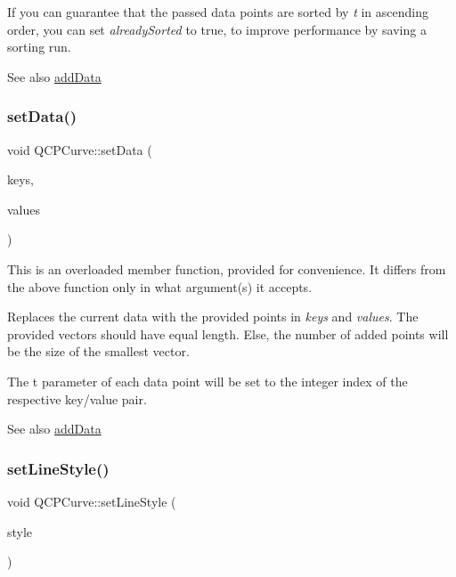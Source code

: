If you can guarantee that the passed data points are sorted by {\itshape t} in ascending order, you can set {\itshape already\+Sorted} to true, to improve performance by saving a sorting run.

\begin{DoxySeeAlso}{See also}
\hyperlink{class_q_c_p_curve_a73edf394b94f3f24f07518e30565a07f}{add\+Data} 
\end{DoxySeeAlso}
\mbox{\label{class_q_c_p_curve_a9d3245d43304226e013240c94802f7f6}} 
\subsubsection{\texorpdfstring{set\+Data()}{setData()}\hspace{0.1cm}{\footnotesize\ttfamily [3/3]}}
{\footnotesize\ttfamily void Q\+C\+P\+Curve\+::set\+Data (\begin{DoxyParamCaption}\item[{const Q\+Vector$<$ double $>$ \&}]{keys,  }\item[{const Q\+Vector$<$ double $>$ \&}]{values }\end{DoxyParamCaption})}

This is an overloaded member function, provided for convenience. It differs from the above function only in what argument(s) it accepts.

Replaces the current data with the provided points in {\itshape keys} and {\itshape values}. The provided vectors should have equal length. Else, the number of added points will be the size of the smallest vector.

The t parameter of each data point will be set to the integer index of the respective key/value pair.

\begin{DoxySeeAlso}{See also}
\hyperlink{class_q_c_p_curve_a73edf394b94f3f24f07518e30565a07f}{add\+Data} 
\end{DoxySeeAlso}
\mbox{\label{class_q_c_p_curve_a4a377ec863ff81a1875c3094a6177c19}} 
\subsubsection{\texorpdfstring{set\+Line\+Style()}{setLineStyle()}}
{\footnotesize\ttfamily void Q\+C\+P\+Curve\+::set\+Line\+Style (\begin{DoxyParamCaption}\item[{\hyperlink{class_q_c_p_curve_a2710e9f79302152cff794c6e16cc01f1}{Q\+C\+P\+Curve\+::\+Line\+Style}}]{style }\end{DoxyParamCaption})}

